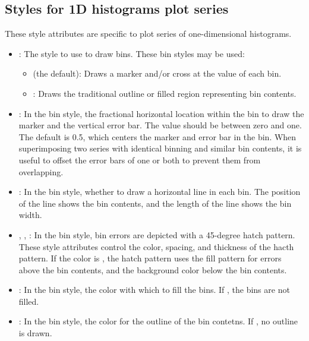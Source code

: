\subsection{Styles for 1D histograms plot series}

These style attributes are specific to plot series of one-dimensional
histograms.

\begin{itemize}
 \item {}: The style to use to draw bins.  These bin styles
 may be used:
 \begin{itemize}
  \item {} (the default): Draws a marker and/or cross at
  the value of each bin.

  \item {}: Draws the traditional outline or filled region
  representing bin contents.

 \end{itemize}

 \item {}: In the  bin style, the
 fractional horizontal location within the bin to draw the marker and
 the vertical error bar.  The value should be between zero and one.  The
 default is 0.5, which centers the marker and error bar in the bin.
 When superimposing two series with identical binning and similar bin
 contents, it is useful to offset the error bars of one or both to
 prevent them from overlapping.

 \item {}: In the  bin style, whether to
 draw a horizontal line in each bin.  The position of the line shows the
 bin contents, and the length of the line shows the bin width.

 \item {}, ,
 : In the  bin style, bin
 errors are depicted with a 45-degree hatch pattern.  These style
 attributes control the color, spacing, and thickness of the hacth
 pattern.  If the color is , the hatch pattern uses the fill
 pattern for errors above the bin contents, and the background color
 below the bin contents.

 \item {}: In the  bin style, the color
 with which to fill the bins.  If , the bins are not filled.

 \item {}: In the  bin style, the color
 for the outline of the bin contetns.  If , no outline is
 drawn.

\end{itemize}


